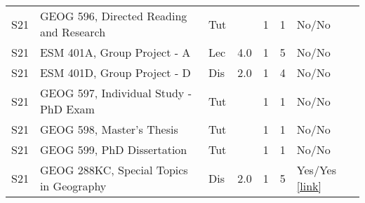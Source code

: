\begin{longtable}{lp{7cm}p{0.75cm}rrrp{2.5cm}}
S21 & GEOG 596, Directed Reading and Research & Tut &  & 1 & 1 & No/No    \\ 
S21 & ESM 401A, Group Project - A & Lec & 4.0 & 1 & 5 & No/No    \\ 
S21 & ESM 401D, Group Project - D & Dis & 2.0 & 1 & 4 & No/No    \\ 
S21 & GEOG 597, Individual Study - PhD Exam & Tut &  & 1 & 1 & No/No    \\ 
S21 & GEOG 598, Master’s Thesis & Tut &  & 1 & 1 & No/No    \\ 
S21 & GEOG 599, PhD Dissertation & Tut &  & 1 & 1 & No/No    \\ 
S21 & GEOG 288KC, Special Topics in Geography & Dis & 2.0 & 1 & 5 & Yes/Yes  \href{https://ucsb.box.com/s/wkdexakrybpri16xk2gu5860so2ae0xa}{[link]}  \\ 
 
\end{longtable}

